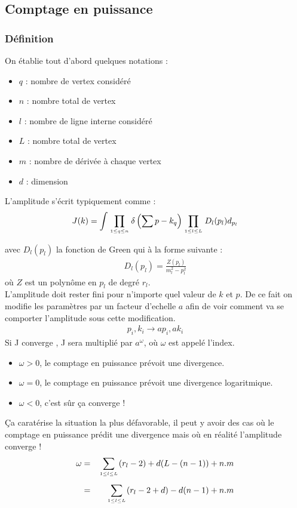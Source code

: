 \documentclass[a4paper,11pt]{article} %
\theoremstyle{plain}
\theoremstyle{definition}
\theoremstyle{remark}
\numberwithin{equation}{section}
\numberwithin{equation}{subsection}
\numberwithin{figure}{section}
\begin{document}
  \subsection{Comptage en puissance}

    \subsubsection{Définition}

\noindent
On établie tout d'abord quelques notations :
\begin{itemize}
 \item $q$ : nombre de vertex considéré
 \item $n$ : nombre total de vertex
 \item $l$ : nombre de ligne interne considéré
 \item $L$ : nombre total de vertex
 \item $m$ : nombre de dérivée à chaque vertex
 \item $d$ : dimension
\end{itemize}
L'amplitude s'écrit typiquement comme :
\begin{eqnarray*}
 J(k)= \int \prod_{ {1\le q\le n\atop} } \delta \left( \sum p - k_{q} \right) \prod_{1\le l\le L\atop} D_{l}(p_{l}) d_{p_{l}}
\end{eqnarray*}
avec $D_{l}(p_{l})$ la fonction de Green qui à la forme suivante :
\begin{eqnarray*}
 D_{l}(p_{l}) = \frac{Z(p_{l})}{ m_{l}^{2}-p_{l}^{2}  }
\end{eqnarray*}
où $Z$ est un polynôme en $p_{l}$ de degré $r_{l}$.\\
L'amplitude doit rester fini pour n'importe quel valeur de $k$ et $p$. De ce fait on modifie les paramètres par un facteur d'echelle $a$ 
afin de voir comment va se comporter l'amplitude sous cette modification.
\begin{eqnarray*}
 p_i , k_i \rightarrow a p_i , a k_i
\end{eqnarray*}
Si J converge , J sera multiplié par $a^{\omega}$, où $\omega$ est appelé l'index.
\begin{itemize}
 \item $\omega > 0$, le comptage en puissance prévoit une divergence.
 \item $\omega = 0$, le comptage en puissance prévoit une divergence logaritmique.
 \item $\omega < 0$, c'est sûr ça converge !
\end{itemize}
Ça caratérise la situation la plus défavorable, il peut y avoir des cas où le comptage en puissance prédit une divergence mais 
où en réalité l'amplitude converge !\\
\begin{eqnarray*}
 \omega &=& \sum_{{1\le l\le L\atop}} (r_{l}-2) + d(L-(n-1)) + n.m\\
 &=& \sum_{{1\le l\le L\atop}} (r_{l}-2+d) - d(n-1) + n.m
\end{eqnarray*}
\end{document}
